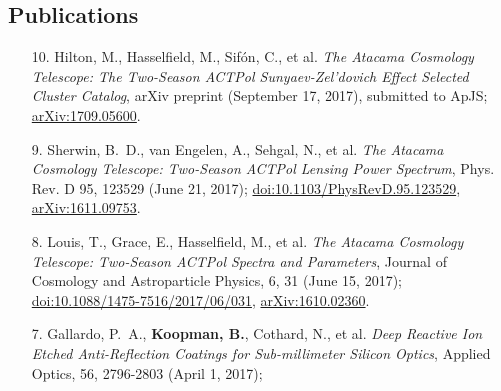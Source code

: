 \documentclass[margin,line]{res}
\begin{document}
\begin{resume}
\section{\sc Publications} 
\begin{enumerate}

\item[{10.}] Hilton, M., Hasselfield, M., Sif{\'o}n, C., et al. \textit{The
Atacama Cosmology Telescope: The Two-Season ACTPol Sunyaev-Zel'dovich Effect
Selected Cluster Catalog}, arXiv preprint (September 17, 2017), submitted to ApJS;
    \href{https://arxiv.org/abs/1709.05600}{arXiv:1709.05600}.
\item[{9.}] Sherwin, B.~D., van Engelen, A., Sehgal, N., et al. \textit{The
    Atacama Cosmology Telescope: Two-Season ACTPol Lensing Power Spectrum},
    Phys. Rev. D 95, 123529 (June 21, 2017);
    \href{https://doi.org/10.1103/PhysRevD.95.123529}{doi:10.1103/PhysRevD.95.123529},
    \href{https://arxiv.org/abs/1611.09753}{arXiv:1611.09753}.
\item[{8.}] Louis, T., Grace, E., Hasselfield, M., et al. \textit{The Atacama
    Cosmology Telescope: Two-Season ACTPol Spectra and Parameters},
    Journal of Cosmology and Astroparticle Physics, 6, 31 (June 15, 2017);
    \href{http://dx.doi.org/10.1088/1475-7516/2017/06/031}{doi:10.1088/1475-7516/2017/06/031},
    \href{https://arxiv.org/abs/1610.02360}{arXiv:1610.02360}.
\item[{7.}] Gallardo, P.~A., \textbf{Koopman, B.}, Cothard, N., et al. \textit{Deep
    Reactive Ion Etched Anti-Reflection Coatings for Sub-millimeter Silicon
    Optics}, Applied Optics, 56, 2796-2803 (April 1, 2017);


\end{enumerate}
\end{resume}
\end{document}
